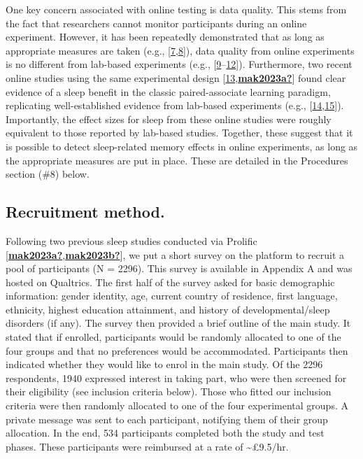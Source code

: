 \documentclass[
]{article}
\begin{document}
One key concern associated with online testing is data quality. This stems from the fact that researchers cannot monitor participants during an online experiment. However, it has been repeatedly demonstrated that as long as appropriate measures are taken (e.g., {[}\protect\hyperlink{ref-rodd2019a}{7},\protect\hyperlink{ref-curtis2022a}{8}{]}), data quality from online experiments is no different from lab-based experiments (e.g., {[}\protect\hyperlink{ref-anwyl-irvine2020a}{9}--\protect\hyperlink{ref-mak2021b}{12}{]}). Furthermore, two recent online studies using the same experimental design {[}\protect\hyperlink{ref-ashton2021a}{13},\protect\hyperlink{ref-mak2023a}{\textbf{mak2023a?}}{]} found clear evidence of a sleep benefit in the classic paired-associate learning paradigm, replicating well-established evidence from lab-based experiments (e.g., {[}\protect\hyperlink{ref-lo2014a}{14},\protect\hyperlink{ref-plihal1997a}{15}{]}). Importantly, the effect sizes for sleep from these online studies were roughly equivalent to those reported by lab-based studies. Together, these suggest that it is possible to detect sleep-related memory effects in online experiments, as long as the appropriate measures are put in place. These are detailed in the Procedures section (\#8) below.

\hypertarget{recruitment-method.}{%
\subsection{Recruitment method.}\label{recruitment-method.}}

Following two previous sleep studies conducted via Prolific {[}\protect\hyperlink{ref-mak2023a}{\textbf{mak2023a?}},\protect\hyperlink{ref-mak2023b}{\textbf{mak2023b?}}{]}, we put a short survey on the platform to recruit a pool of participants (N = 2296). This survey is available in Appendix A and was hosted on Qualtrics. The first half of the survey asked for basic demographic information: gender identity, age, current country of residence, first language, ethnicity, highest education attainment, and history of developmental/sleep disorders (if any). The survey then provided a brief outline of the main study. It stated that if enrolled, participants would be randomly allocated to one of the four groups and that no preferences would be accommodated. Participants then indicated whether they would like to enrol in the main study. Of the 2296 respondents, 1940 expressed interest in taking part, who were then screened for their eligibility (see inclusion criteria below). Those who fitted our inclusion criteria were then randomly allocated to one of the four experimental groups. A private message was sent to each participant, notifying them of their group allocation. In the end, 534 participants completed both the study and test phases. These participants were reimbursed at a rate of \textasciitilde£9.5/hr.
\end{document}
